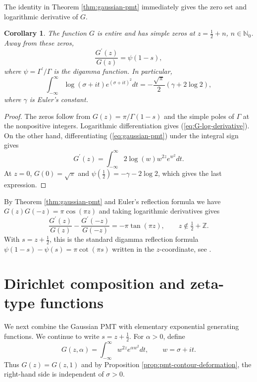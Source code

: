 \documentclass[12pt,english]{article}
\theoremstyle{plain} %
\newtheorem{corollary}{Corollary}
\theoremstyle{remark} %
\begin{document}
The identity in Theorem \ref{thm:gaussian-pmt} immediately gives the zero set
and logarithmic derivative of $G$.

\begin{corollary}
\label{cor:G-consequences}
The function $G$ is entire and has simple zeros at
$z=\tfrac{1}{2}+n$, $n\in\mathbb{N}_0$. Away from these zeros,
\begin{equation}
\frac{G^\prime(z)}{G(z)}=\psi(1-s),
\label{eq:G-log-derivative}
\end{equation}
where $\psi=\Gamma^\prime/\Gamma$ is the digamma function. In particular,
$$
\int_{-\infty}^{\infty}\log(\sigma+it)e^{(\sigma+it)^2}dt
=
-\frac{\sqrt{\pi}}{2}(\gamma+2\log2),
$$
where $\gamma$ is Euler's constant.
\end{corollary}

\begin{proof}
The zeros follow from $G(z)=\pi/\Gamma(1-s)$ and the simple poles of $\Gamma$
at the nonpositive integers. Logarithmic differentiation gives
(\ref{eq:G-log-derivative}). On the other hand, differentiating
(\ref{eq:gaussian-pmt}) under the integral sign gives
$$
G^\prime(z)=
\int_{-\infty}^{\infty}
2\log(w)w^{2z}e^{w^2}dt.
$$
At $z=0$, $G(0)=\sqrt{\pi}$ and
$\psi(\tfrac{1}{2})=-\gamma-2\log2$, which gives the last expression.
\end{proof}

By Theorem \ref{thm:gaussian-pmt} and Euler's reflection formula we have $G(z)G(-z)=\pi\cos(\pi z)$ and taking logarithmic derivatives gives
$$
\frac{G^\prime(z)}{G(z)}
-
\frac{G^\prime(-z)}{G(-z)}
=
-\pi\tan(\pi z),
\qquad z\notin \tfrac{1}{2}+\mathbb{Z}.
$$
With $s=z+\tfrac{1}{2}$, this is the standard digamma reflection formula $\psi(1-s)-\psi(s)=\pi\cot(\pi s)$ written in the $z$-coordinate, see \citet[5.5.4]{DLMF}.

\section{Dirichlet composition and zeta-type functions}
\label{sec:dirichlet-zeta}

We next combine the Gaussian PMT with elementary exponential generating
functions. We continue to write $s=z+\tfrac{1}{2}$. For $\alpha>0$, define
$$
G(z,\alpha)
=\int_{-\infty}^{\infty}w^{2z}e^{\alpha w^2}dt,
\qquad w=\sigma+it.
$$
Thus $G(z)=G(z,1)$ and by Proposition \ref{prop:pmt-contour-deformation}, the right-hand side is
independent of $\sigma>0$.
\end{document}
